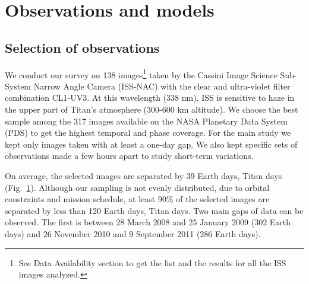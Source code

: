 \section{Observations and models}

\subsection{Selection of observations}
We conduct our survey on 138 images\footnote{See Data Availability section to get the list and the results for all the ISS images analyzed.}
taken by the Cassini Image Science Sub-System Narrow Angle Camera (ISS-NAC) with the
clear and ultra-violet filter combination CL1-UV3. At this wavelength (338 nm), ISS is sensitive to haze in the
upper part of Titan's atmosphere (300-600 km altitude). We choose the best sample among the 317 images available on the NASA Planetary Data System (PDS)
to get the highest temporal and phase coverage. For the main study we kept only images taken with at least a one-day gap.
We also kept specific sets of observations made a few hours apart to study short-term variations.

On average, the selected images are separated by 39 Earth days,  Titan days (Fig.~\ref{fig:img_sampling}).
Although our sampling is not evenly distributed, due to orbital constraints and mission schedule, at least 90\% of the selected
images are separated by less than 120 Earth days,  Titan days. Two main gaps of data can be observed.
The first is between 28 March 2008 and 25 January 2009 (302 Earth days) and 26 November 2010 and 9 September 2011 (286 Earth days).

\begin{figure}[ht!]
\caption{}
\label{fig:img_sampling}
\end{figure}

